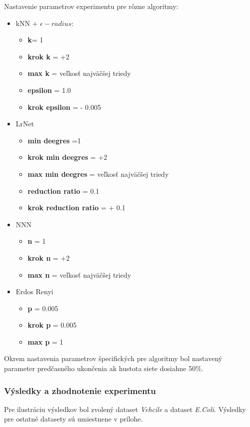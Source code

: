 \documentclass[slovak,master,dept460,male,cpp,cpdeclaration]{diploma}
\begin{document}
Nastavenie parametrov experimentu pre rôzne algoritmy:
\begin{itemize}
\item kNN + $\epsilon-radius$:
\begin{itemize}
    \item \textbf{k}= 1
    \item\textbf{krok k} = +2
    \item\textbf{max k} = veľkosť najväčšej triedy
    \item \textbf{epsilon} = 1.0
    \item \textbf{krok epsilon} = - 0.005 
\end{itemize}
\item LrNet
\begin{itemize}
    \item \textbf{min deegres} =1
    \item\textbf{krok min deegres} = +2
    \item \textbf{max min deegres} = veľkosť najväčšej triedy
    \item \textbf{reduction ratio} = 0.1
    \item\textbf{krok reduction ratio} = + 0.1
\end{itemize}
\item NNN
\begin{itemize}
    \item\textbf{n} = 1
    \item \textbf{krok n} = +2
    \item \textbf{max n} = veľkosť najväčšej triedy
\end{itemize}
\item Erdos Renyi
\begin{itemize}
    \item \textbf{p} = 0.005
    \item\textbf{ krok p} = 0.005
    \item\textbf{ max p} = 1
\end{itemize}
\end{itemize}

Okrem nastavenia parametrov špecifických pre algoritmy bol nastavený parameter predčasného ukončenia ak hustota siete dosiahne 50\%.


\subsubsection{Výsledky a zhodnotenie experimentu}
Pre ilustráciu výsledkov bol zvolený dataset \textit{Vehcile} a dataset \textit{E.Coli}. Výsledky pre ostatné datasety sú umiestnene v prílohe. 
\end{document}
